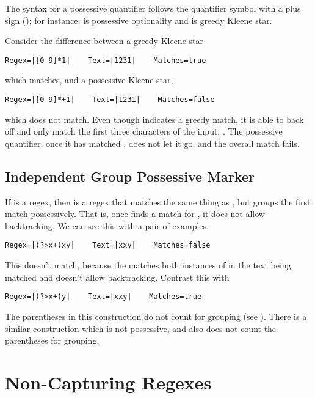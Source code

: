 The syntax for a possessive quantifier follows the quantifier symbol
with a plus sign (\code{+}); for instance,  is possessive
optionality and \code{*+} is greedy Kleene star.

Consider the difference between a greedy Kleene star
%
\begin{verbatim}
Regex=|[0-9]*1|    Text=|1231|    Matches=true
\end{verbatim}
%
which matches, and a possessive Kleene star,
%
\begin{verbatim}
Regex=|[0-9]*+1|    Text=|1231|    Matches=false
\end{verbatim}
%
which does not match.  Even though \code{[0-9]*} indicates a greedy
match, it is able to back off and only match the first three
characters of the input, .  The possessive quantifier, once
it has matched , does not let it go, and the overall match
fails.

\subsection{Independent Group Possessive Marker}

If  is a regex, then  is a regex that
matches the same thing as , but groups the first match
possessively.  That is, once  finds a match
for , it does not allow backtracking.   We can see this
with a pair of examples.
%
\begin{verbatim}
Regex=|(?>x+)xy|    Text=|xxy|    Matches=false
\end{verbatim}
%
This doesn't match, because the  matches both
instances of  in the text being matched and doesn't
allow backtracking.  Contrast this with
%
\begin{verbatim}
Regex=|(?>x+)y|    Text=|xxy|    Matches=true
\end{verbatim}

The parentheses in this construction do not count for grouping
(see ).  There is a similar construction
 which is not possessive, and also does
not count the parentheses for grouping.  


\section{Non-Capturing Regexes}

